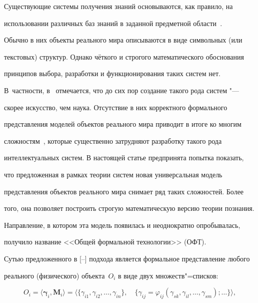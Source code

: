 


\makerutitle



\smallskip



Существующие системы получения знаний основываются, как правило, на

использовании различных баз знаний в заданной предметной области~\cite{krylov:bib1,krylov:bib2}.

Обычно в них объекты реального мира описываются в виде символьных (или

текстовых) структур. Однако чёткого и строгого математического обоснования

принципов выбора, разработки и функционирования таких систем нет. 

В~частности, в~\cite{krylov:bib1} отмечается, что до сих пор создание такого рода систем "---

скорее искусство, чем наука. Отсутствие в них корректного формального

представления моделей объектов реального мира приводит в итоге ко многим

сложностям~\cite{krylov:bib2}, которые существенно затрудняют разработку такого рода

интеллектуальных систем. В настоящей статье предпринята попытка показать,

что предложенная в рамках теории систем новая универсальная модель

представления объектов реального мира снимает ряд таких сложностей. Более

того, она позволяет построить строгую математическую версию теории познания.

Направление, в котором эта модель появилась и неоднократно опробывалась,

получило название <<Общей формальной технологии>> (ОФТ).



Сутью предложенного в [--] подхода является формальное представление любого

реального (физического) объекта~$O_{i}$ в виде двух множеств"=списков:

\begin{equation}

\label{krylov:eq1}

O_{i}=\langle \boldsymbol{\gamma}_i, \mathbf{M}_i \rangle=\langle \{\gamma_{i1}, \gamma_{i2},\ldots, \gamma_{in}\},

\quad \{\gamma_{ij}=\varphi_{ij}(\gamma_{sk}, \gamma_{il},\ldots,\gamma_{sm});\ldots\}\rangle,

\end{equation}

